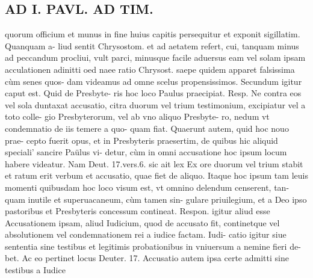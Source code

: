 \documentclass{article}
\begin{document}
\begin{pages}
\section*{AD I. PAVL. AD TIM. }
\marginpar{[ p.34. ]}\pstart quorum officium et munus in fine huius capitis persequitur et exponit sigillatim. Quanquam a- liud sentit Chrysostom. et ad aetatem refert, cui, tanquam minus ad peccandum procliui, vult parci, minusque  facile aduersus eam vel solam ipsam acculationen adinitti oed naee ratio Chrysost. saepe quidem apparet falsissima cùm senes quos- dam videamus ad omne scelus propensissimos.  \pend\pstart Secundum igitur caput est. Quid de Presbyte- ris hoc loco Paulus praecipiat. Resp. Ne contra eos vel sola duntaxat accusatio, citra duorum vel trium testimonium, excipiatur vel a toto colle- gio Presbyterorum, vel ab vno aliquo Presbyte- ro, nedum vt condemnatio de iis temere a quo- quam fiat. Quaerunt autem, quid hoc nouo prae- cepto fuerit opus, et in Presbyteris praesertim, de quibus hic aliquid speciali' sancire Paülus vi- detur, cùm in omni accusatione hoc ipsum locum habere videatur. Nam Deut. 17.vers.6. sic ait lex Ex ore duorum vel trium stabit et ratum erit verbum et accusatio, quae fiet de aliquo. Itaque hoc ipsum tam leuis momenti quibusdam hoc loco visum est, vt omnino delendum censerent, tan- quam inutile et superuacaneum, cùm tamen sin- gulare priuilegium, et a Deo ipso pastoribus et Presbyteris concessum contineat. Respon. igitur aliud esse Accusationem ipsam, aliud Iudicium, quod de accusato fit, continetque vel absolutionem vel condemnationem rei a iudice factam. Iudi- catio igitur siue sententia sine testibus et legitimis probationibus in vniuersum a nemine fieri de- bet. Ac eo pertinet locus Deuter. 17. Accusatio autem ipsa certe admitti sine testibus a Iudice  \pend

\end{pages}
\end{document}
